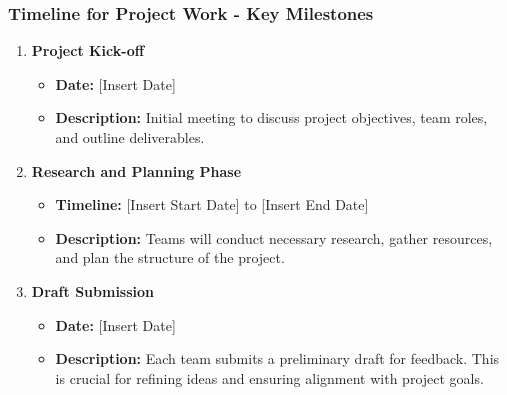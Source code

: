 \documentclass[aspectratio=169]{beamer}
\begin{document}
\begin{frame}[fragile]
    \frametitle{Timeline for Project Work - Key Milestones}
    \begin{enumerate}
        \item \textbf{Project Kick-off}
        \begin{itemize}
            \item \textbf{Date:} [Insert Date]
            \item \textbf{Description:} Initial meeting to discuss project objectives, team roles, and outline deliverables.
        \end{itemize}
        
        \item \textbf{Research and Planning Phase}
        \begin{itemize}
            \item \textbf{Timeline:} [Insert Start Date] to [Insert End Date]
            \item \textbf{Description:} Teams will conduct necessary research, gather resources, and plan the structure of the project.
        \end{itemize}

        \item \textbf{Draft Submission}
        \begin{itemize}
            \item \textbf{Date:} [Insert Date]
            \item \textbf{Description:} Each team submits a preliminary draft for feedback. This is crucial for refining ideas and ensuring alignment with project goals.
        \end{itemize}
    \end{enumerate}
\end{frame}
\end{document}
